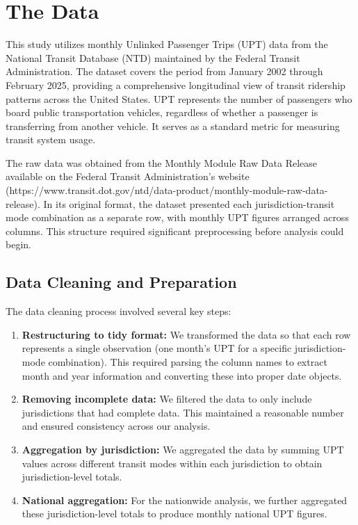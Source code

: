 \documentclass[11pt]{article}
\begin{document}
\section{The Data}

This study utilizes monthly Unlinked Passenger Trips (UPT) data from the National Transit Database (NTD) maintained by the Federal Transit Administration. The dataset covers the period from January 2002 through February 2025, providing a comprehensive longitudinal view of transit ridership patterns across the United States. UPT represents the number of passengers who board public transportation vehicles, regardless of whether a passenger is transferring from another vehicle. It serves as a standard metric for measuring transit system usage.

The raw data was obtained from the Monthly Module Raw Data Release available on the Federal Transit Administration's website (https://www.transit.dot.gov/ntd/data-product/monthly-module-raw-data-release). In its original format, the dataset presented each jurisdiction-transit mode combination as a separate row, with monthly UPT figures arranged across columns. This structure required significant preprocessing before analysis could begin.

\subsection{Data Cleaning and Preparation}

The data cleaning process involved several key steps:

\begin{enumerate}
  \item \textbf{Restructuring to tidy format:} We transformed the data so that each row represents a single observation (one month's UPT for a specific jurisdiction-mode combination). This required parsing the column names to extract month and year information and converting these into proper date objects.
  
  \item \textbf{Removing incomplete data:} We filtered the data to only include jurisdictions that had complete data. This maintained a reasonable number and ensured consistency across our analysis.
  
  \item \textbf{Aggregation by jurisdiction:} We aggregated the data by summing UPT values across different transit modes within each jurisdiction to obtain jurisdiction-level totals.
  
  \item \textbf{National aggregation:} For the nationwide analysis, we further aggregated these jurisdiction-level totals to produce monthly national UPT figures.
\end{enumerate}
\end{document}
